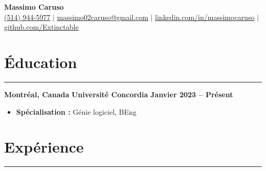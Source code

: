 \documentclass[10pt]{article}
\begin{document}
\newcommand{\fullname}{Massimo Caruso}
\newcommand{\phone}{(514) 944-5977}
\newcommand{\email}{massimo02caruso@gmail.com}
\newcommand{\linkedin}{linkedin.com/in/massimocaruso}
\newcommand{\github}{github.com/Extinctable}

\begin{center}
    {\Huge \textbf{\fullname}} \\
    \vspace{1mm}
    {\small 
    \faPhone \hspace{0mm} \href{tel:+15149445977}{\phone} $\vert$ 
    \faEnvelope \hspace{0mm} \href{mailto:massimo02caruso@gmail.com}{\email} $\vert$ 
    \faLinkedin \hspace{0mm} \href{https://linkedin.com/in/massimocaruso}{\linkedin} $\vert$ 
    \faGithub \hspace{0mm} \href{https://github.com/Extinctable}{\github}
    }
\end{center}

\vspace{-8mm}

\section*{Éducation}
\vspace{-2mm}
\hrule
\vspace{0mm}

\textbf{Montréal, Canada} \hfill \textbf{Université Concordia} \hfill \textbf{Janvier 2023 -- Présent} 
\vspace{-4mm}
\begin{itemize}[left=0.15in, itemsep=0pt]
    \item \textbf{Spécialisation :} Génie logiciel, BEng
\end{itemize}

\section*{Expérience}
\vspace{-2mm}
\hrule
\vspace{0mm}
\end{document}
